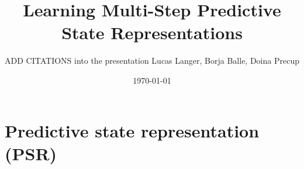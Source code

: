 \documentclass{beamer}
\title[Multi-Step PSR]{Learning Multi-Step Predictive State Representations} %
\author{ADD CITATIONS into the presentation Lucas Langer, Borja Balle, Doina Precup} %
\institute[McGill University] %
{
\\
\medskip
}
\date{\today} %
\begin{document}
\begin{frame}
\titlepage %
\end{frame}

\begin{comment}
\begin{frame}
\frametitle{Overview} %
\tableofcontents %
\end{frame}
\end{comment}



\section{Predictive state representation (PSR)} %



\end{document}
